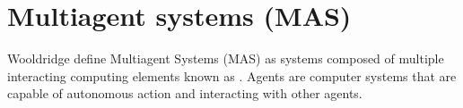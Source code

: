 \section{Multiagent systems (MAS)}
Wooldridge \cite{woolridge_introduction_2001} define Multiagent Systems (MAS) as systems composed of multiple interacting computing elements known as .
Agents are computer systems that are capable of autonomous action and interacting with other agents.
